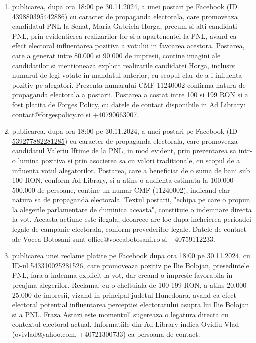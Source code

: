 \documentclass[a4paper,12pt]{article}
\begin{document}
\begin{enumerate}[leftmargin=*, label=\arabic*.)]
    \item publicarea, dupa ora 18:00 pe 30.11.2024, a unei postari pe Facebook (ID \href{https://www.facebook.com/ads/library/?id=439880395442886}{439880395442886}) cu caracter de propaganda electorala, care promoveaza candidatul PNL la Senat, Maria Gabriela Horga, precum si alti candidati PNL,  prin evidentierea realizarilor lor si a apartenentei la PNL, avand ca efect electoral influentarea pozitiva a votului in favoarea acestora. Postarea, care a generat intre 80.000 si 90.000 de impresii,  contine imagini ale candidatilor si mentioneaza explicit realizarile candidatei Horga, inclusiv numarul de legi votate in mandatul anterior,  cu scopul clar de a-i influenta pozitiv pe alegatori.  Prezenta numarului CMF 11240002 confirma natura de propaganda electorala a postarii.  Postarea a costat intre 100 si 199 RON si a fost platita de Forges Policy, cu datele de contact disponibile in Ad Library: contact@forgespolicy.ro si +40790663007.
    \item publicarea, dupa ora 18:00 pe 30.11.2024, a unei postari pe Facebook (ID \href{https://www.facebook.com/ads/library/?id=539277882281285}{539277882281285}) cu caracter de propaganda electorala, care promoveaza candidatul Valeriu Iftime de la PNL,  in mod evident, prin prezentarea sa intr-o lumina pozitiva si prin asocierea sa cu valori traditionale,  cu scopul de a influenta votul alegatorilor.  Postarea, care a beneficiat de o suma de bani sub 100 RON, conform Ad Library, si a atins o audienta estimata la 100.000-500.000 de persoane, contine un numar CMF (11240002), indicand clar natura sa de propaganda electorala.  Textul postarii,  "echipa pe care o propun la alegerile parlamentare de duminica aceasta", constituie o indemnare directa la vot.  Aceasta actiune este ilegala, deoarece are loc dupa incheierea perioadei legale de campanie electorala, conform prevederilor legale.  Datele de contact ale Vocea Botosani sunt office@voceabotosani.ro si +40759112233.
    \item publicarea unei reclame platite pe Facebook dupa ora 18:00 pe 30.11.2024, cu ID-ul \href{https://www.facebook.com/ads/library/?id=543310025281526}{543310025281526}, care promoveaza pozitiv pe Ilie Bolojan, presedintele PNL, fara a indemna explicit la vot, dar creand o impresie favorabila in preajma alegerilor.  Reclama, cu o cheltuiala de 100-199 RON, a atins 20.000-25.000 de impresii, vizand in principal judetul Hunedoara, avand ca efect electoral potential influentarea perceptiei electoratului asupra lui Ilie Bolojan si a PNL.  Fraza Astazi este momentul! sugereaza o legatura directa cu contextul electoral actual.  Informatiile din Ad Library indica Ovidiu Vlad (ovivlad@yahoo.com, +40721300733) ca persoana de contact.

\end{enumerate}
\end{document}
